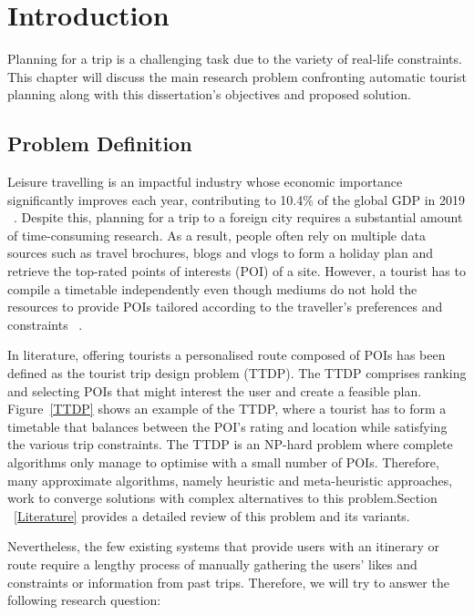 \section{Introduction}
\label{Introduction}

Planning for a trip is a challenging task due to the
variety of real-life constraints. This chapter will
discuss the main research problem confronting
automatic tourist planning along with this
dissertation's objectives and proposed solution.

\subsection{Problem Definition}
Leisure travelling is an impactful industry
whose economic importance significantly improves each
year, contributing to 10.4\% of the global GDP in 2019
~\cite{wttc2018travel}. Despite this, planning for a trip to a
foreign city requires a substantial amount of
time-consuming research. As a result, people often
rely on multiple data sources such as travel
brochures, blogs and vlogs to form a holiday plan and
retrieve the top-rated points of interests (POI) of a site. 
However, a tourist has to compile a timetable
independently even though mediums do not hold the
resources to provide POIs tailored according to the
traveller's preferences and constraints
~\cite{DeChoudhury2010}. 

In literature, offering tourists a personalised route
composed of POIs has been defined as the tourist trip
design problem (TTDP). The TTDP comprises ranking
and selecting POIs that might interest the user and
create a feasible plan. Figure~\ref{TTDP} shows an example
of the TTDP,  where a tourist has to form a timetable
that balances between the POI's rating and location
while satisfying the various trip constraints. 
The TTDP is an NP-hard problem where complete 
algorithms only manage to optimise with a small number
of POIs. Therefore, many approximate algorithms,
namely heuristic and meta-heuristic approaches, work
to converge solutions with complex alternatives to
this problem.Section
~\ref{Literature} provides a detailed review of this problem and its
variants.  


Nevertheless, the few existing systems that provide
users with an itinerary or route require a lengthy
process of manually gathering the users' likes and
constraints or information from past trips. Therefore, 
we will try to answer the following research question:


